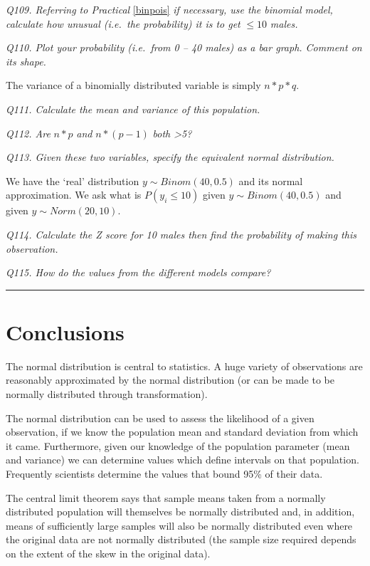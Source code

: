 \documentclass[
  11pt,
  a4paper,
]{book}
\begin{document}
\emph{Q109. Referring to Practical} \ref{binpois} \emph{if necessary, use the binomial model, calculate how unusual (i.e.~the probability) it is to get} \(\leq 10\) \emph{males.}

\emph{Q110. Plot your probability (i.e.~from 0 -- 40 males) as a bar graph. Comment on its shape.}

The variance of a binomially distributed variable is simply \(n*p*q\).

\emph{Q111. Calculate the mean and variance of this population.}

\emph{Q112. Are} \(n*p\) \emph{and} \(n*(p-1)\) \emph{both \textgreater5?}

\emph{Q113. Given these two variables, specify the equivalent normal distribution.}

We have the `real' distribution \(y \sim Binom(40,0.5)\) and its normal approximation. We ask what is \(P(y_i \leq 10)\) given \(y \sim Binom(40, 0.5)\) and given \(y \sim Norm(20, 10)\).

\emph{Q114. Calculate the Z score for 10 males then find the probability of making this observation.}

\emph{Q115. How do the values from the different models compare?}

\begin{center}\rule{0.5\linewidth}{0.5pt}\end{center}

\hypertarget{conclusions-2}{%
\section{Conclusions}\label{conclusions-2}}

The normal distribution is central to statistics. A huge variety of observations are reasonably approximated by the normal distribution (or can be made to be normally distributed through transformation).

The normal distribution can be used to assess the likelihood of a given observation, if we know the population mean and standard deviation from which it came. Furthermore, given our knowledge of the population parameter (mean and variance) we can determine values which define intervals on that population. Frequently scientists determine the values that bound 95\% of their data.

The central limit theorem says that sample means taken from a normally distributed population will themselves be normally distributed and, in addition, means of sufficiently large samples will also be normally distributed even where the original data are not normally distributed (the sample size required depends on the extent of the skew in the original data).
\end{document}
